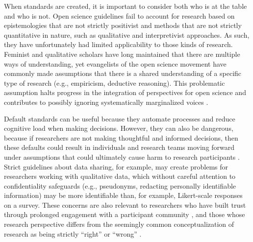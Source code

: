 \documentclass[authordate, meta, issue]{jote-new-article}
\begin{document}
When standards are created, it is important to consider both who is at the table and who is not. Open science guidelines fail to account for research based on epistemologies that are not strictly positivist and methods that are not strictly quantitative in nature, such as qualitative and interpretivist approaches. As such, they have unfortunately had limited applicability to those kinds of research. Feminist and qualitative scholars have long maintained that there are multiple ways of understanding, yet evangelists of the open science movement have commonly made assumptions that there is a shared understanding of a specific type of research (e.g., empiricism, deductive reasoning). This problematic assumption halts progress in the integration of perspectives for open science and contributes to possibly ignoring systematically marginalized voices \parencites[see][]{Bennett2022}.



Default standards can be useful because they automate processes and reduce cognitive load when making decisions. However, they can also be dangerous, because if researchers are not making thoughtful and informed decisions, then these defaults could result in individuals and research teams moving forward under assumptions that could ultimately cause harm to research participants \parencites{Sakaluk2021}{Steltenpohl2021}. Strict guidelines about data sharing, for example, may create problems for researchers working with qualitative data, which without careful attention to confidentiality safeguards (e.g., pseudonyms, redacting personally identifiable information) may be more identifiable than, for example, Likert-scale responses on a survey. These concerns are also relevant to researchers who have built trust through prolonged engagement with a participant community \parencites{Ross2018}, and those whose research perspective differs from the seemingly common conceptualization of research as being strictly “right” or “wrong” \parencites{Lash2015}.
\end{document}

